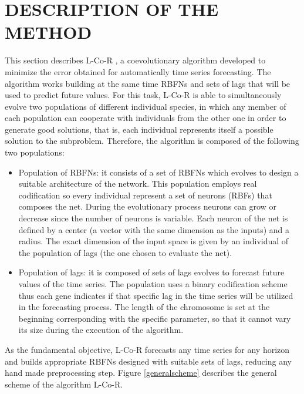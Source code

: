 \documentclass[a4paper,twoside]{article}
\newcommand{\metodo}{L-Co-R}
\begin{document}
\section{\uppercase{Description of the method}}
\label{sec:method}

\noindent This section describes {\metodo} \cite{Parras2012Softcomputing}, a coevolutionary algorithm developed to minimize the error obtained for automatically time series forecasting. The algorithm works building at the same time RBFNs and sets of lags that will be used to predict future values. For this task, {\metodo} is able to simultaneously evolve two populations of different individual species, in which any member of each population can cooperate with individuals from the other one in order to generate good solutions, that is, each individual represents itself a possible solution to the subproblem. Therefore, the algorithm is composed of the following two populations:

\begin{itemize}
  \item Population of RBFNs: it consists of a set of RBFNs which evolves to design a suitable architecture of the network. This population employs real codification so every individual represent a set of neurons (RBFs) that composes the net. During the evolutionary process neurons can grow or decrease since the number of neurons is variable. Each neuron of the net is defined by a center (a vector with the same dimension as the inputs) and a radius. The exact dimension of the input space is given by an individual of the population of lags (the one chosen to evaluate the net).

  \item Population of lags: it is composed of sets of lags evolves to forecast future values of the time series. The population uses a binary codification scheme thus each gene indicates if that specific lag in the time series will be utilized in the forecasting process. The length of the chromosome is set at the beginning corresponding with the specific parameter, so that it cannot vary its size during the execution of the algorithm.
\end{itemize}


As the fundamental objective, {\metodo} forecasts any time series for any horizon and builds appropriate RBFNs designed with suitable sets of lags, reducing any hand made preprocessing step. Figure \ref{generalscheme} describes the general scheme of the algorithm {\metodo}.
\end{document}
